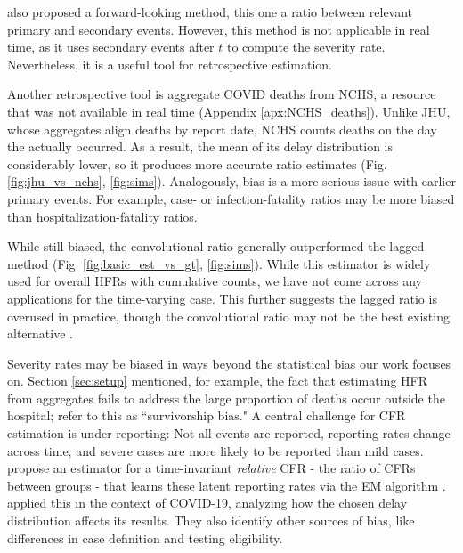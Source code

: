 \documentclass{article}
\begin{document}
\citet{UKpaper} also proposed a forward-looking method, this one a ratio between relevant primary and secondary events. However, this method is not applicable in real time, as it uses secondary events after $t$ to compute the severity rate. Nevertheless, it is a useful tool for retrospective estimation. 

Another retrospective tool is aggregate COVID deaths from NCHS, a resource that was not available in real time (Appendix \ref{apx:NCHS_deaths}). Unlike JHU, whose aggregates align deaths by report date, NCHS counts deaths on the day the actually occurred. As a result, the mean of its delay distribution is considerably lower, so it produces more accurate ratio estimates (Fig. \ref{fig:jhu_vs_nchs}, \ref{fig:sims}). Analogously, bias is a more serious issue with earlier primary events. For example, case- or infection-fatality ratios may be more biased than hospitalization-fatality ratios. 


While still biased, the convolutional ratio generally outperformed the lagged method (Fig. \ref{fig:basic_est_vs_gt}, \ref{fig:sims}). While this estimator is widely used for overall HFRs with cumulative counts, we have not come across any applications for the time-varying case. This further suggests the lagged ratio is overused in practice, though the convolutional ratio may not be the best existing alternative \citep{fusedlasso, UKpaper}.

Severity rates may be biased in ways beyond the statistical bias our work focuses on. Section \ref{sec:setup} mentioned, for example, the fact that estimating HFR from aggregates fails to address the large proportion of deaths occur outside the hospital; \citet{lipsitch2015potential} refer to this as ``survivorship bias." A central challenge for CFR estimation is under-reporting: Not all events are reported, reporting rates change across time, and severe cases are more likely to be reported than mild cases. \citet{reich2012estimating} propose an estimator for a time-invariant \textit{relative} CFR - the ratio of CFRs between groups - that learns these latent reporting rates via the EM algorithm \citep{EM}. \citet{anastasios} applied this in the context of COVID-19, analyzing how the chosen delay distribution affects its results. They also identify other sources of bias, like differences in case definition and testing eligibility.
\end{document}
